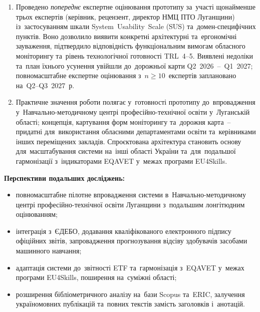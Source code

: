\begin{enumerate}
    \item Проведено \emph{попереднє} експертне оцінювання прототипу за~участі щонайменше трьох експертів (керівник, рецензент, директор НМЦ ПТО Луганщини) із~застосуванням шкали System~Usability~Scale (SUS) та~домен-специфічних пунктів. Воно дозволило виявити конкретні архітектурні та~ергономічні зауваження, підтвердило відповідність функціональним вимогам обласного моніторингу та~рівень технологічної готовності TRL~4--5. Виявлені недоліки та~план їхнього усунення увійшли до~дорожньої карти Q2~2026~--~Q1~2027; повномасштабне експертне оцінювання з~$n\geq 10$~експертів заплановано на~Q2--Q3~2027~р.

    \item Практичне значення роботи полягає у~готовності прототипу до~впровадження у~Навчально-методичному центрі професійно-технічної освіти у~Луганській області; концепція, картування форм моніторингу та~дорожня карта~-- придатні для~використання обласними департаментами освіти та~керівниками інших переміщених закладів. Спроєктована архітектура становить основу для~масштабування системи на~інші області України та~для~подальшої гармонізації з~індикаторами EQAVET у~межах програми EU4Skills.
\end{enumerate}

\textbf{Перспективи подальших досліджень:}
\begin{itemize}
    \item повномасштабне пілотне впровадження системи в~Навчально-методичному центрі професійно-технічної освіти Луганщини з~подальшим лонгітюдним оцінюванням;
    \item інтеграція з~ЄДЕБО, додавання кваліфікованого електронного підпису офіційних звітів, запровадження прогнозування відсіву здобувачів засобами машинного навчання;
    \item адаптація системи до~звітності ETF та~гармонізація з~EQAVET у~межах програми EU4Skills, поширення на~суміжні області;
    \item розширення бібліометричного аналізу на~бази Scopus та~ERIC, залучення україномовних публікацій та~повних текстів замість заголовків і~анотацій.
\end{itemize}
\label{main_text_end}
